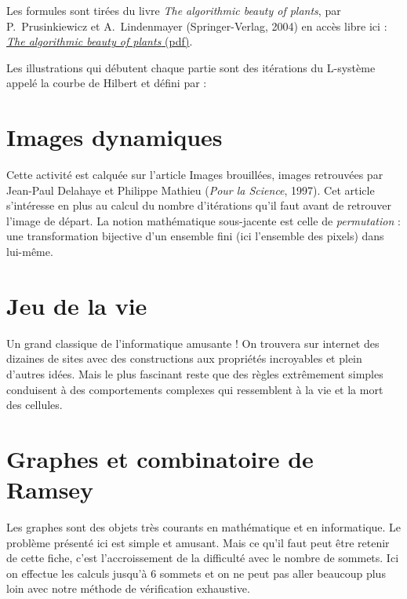 \documentclass[11pt,class=report,crop=false]{standalone}
\begin{document}
Les formules sont tirées du livre \emph{The algorithmic beauty of plants}, par 
P.~Prusinkiewicz et A.~Lindenmayer (Springer-Verlag, 2004) en accès libre ici :
\href{http://algorithmicbotany.org/papers/abop/abop.pdf}{\emph{The algorithmic beauty of plants} (pdf)}.

Les illustrations qui débutent chaque partie sont des itérations du L-système appelé la courbe de Hilbert et défini par :\\
\centerline{
\qquad
{}
\qquad
{}
}

\section{Images dynamiques}


Cette activité est calquée sur l'article \og{}Images brouillées, images retrouvées\fg{}
par Jean-Paul Delahaye et Philippe Mathieu (\emph{Pour la Science}, 1997). Cet article s'intéresse en plus au calcul du nombre d'itérations qu'il faut avant de retrouver l'image de départ. La notion mathématique sous-jacente est celle de \emph{permutation} : une transformation bijective d'un ensemble fini (ici l'ensemble des pixels) dans lui-même.


\section{Jeu de la vie}

Un grand classique de l'informatique amusante ! On trouvera sur internet des dizaines de sites avec des constructions aux propriétés incroyables et plein d'autres idées. Mais le plus fascinant reste que des règles extrêmement simples conduisent à des comportements complexes qui ressemblent à la vie et la mort des cellules.



\section{Graphes et combinatoire de Ramsey}

Les graphes sont des objets très courants en mathématique et en informatique.
Le problème présenté ici est simple et amusant. Mais ce qu'il faut peut être retenir de cette fiche, c'est l'accroissement de la difficulté avec le nombre de sommets. 
Ici on effectue les calculs jusqu'à $6$ sommets et on ne peut pas aller beaucoup plus loin avec notre méthode de vérification exhaustive.
\end{document}
